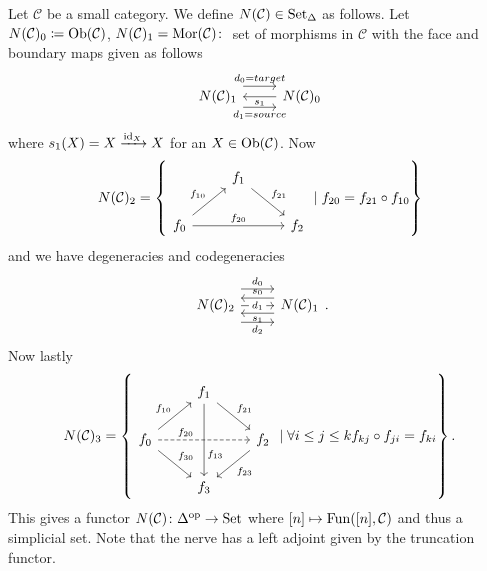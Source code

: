\begin{exmp}
    Let $\mathcal{C}$ be a small category. 
    We define $N(\mathcal{C}) \in \operatorname{Set}_{\Delta}$ as follows. 
    Let $N(\mathcal{C})_0 \coloneqq \operatorname{Ob}(\mathcal{C})$, $N(\mathcal{C})_1=\operatorname{Mor}(\mathcal{C})\colon$ set of morphisms in $\mathcal{C}$ with the face and boundary maps given as follows
    \[
    \begin{tikzcd}
        N ( \mathcal{ C } )_1 
        \ar[r, shift left=1.75ex, "d_0=target"]
        \ar[r, shift right=1.75ex, "d_1=source"']
        &
        N ( \mathcal{ C } )_0
        \ar[l, "s_1"]
    \end{tikzcd}
    \]
    where $ s_1(X) = X \xrightarrow{\operatorname{id}_X} X $ for an $ X \in \operatorname{Ob} ( \mathcal{ C } ) $. Now
    \[
    N ( \mathcal{ C } )_2 =
    \left\{
    \begin{tikzcd}
        &
        f_1
        \ar[rd, "f_{21}"]
        &
        \\
        f_0
        \ar[ru, "f_{10}"]
        \ar[rr, "f_{20}"]
        &&
        f_2
    \end{tikzcd}
    \mid f_{20} = f_{21} \circ f_{10}
    \right\}
    \]
    and we have degeneracies and codegeneracies
    \[
    \begin{tikzcd}
        N ( \mathcal{ C } )_2
        \ar[r, shift left= 2.75ex, "d_0"]
        \ar[r, "d_1" description]
        \ar[r, shift left= -2.75ex, "d_2"']
        &
        N ( \mathcal{ C } )_1
        \ar[l, shift left= - 1.25ex, "s_0"']
        \ar[l, shift left= 1.25ex,"s_1"]
    \end{tikzcd}.
    \]
    Now lastly 
    \[
    N ( \mathcal{ C } )_3 
    =
    \left\{
    \begin{tikzcd}
        & 
        f_1
        \ar[rd, "f_{21}"]
        \ar[dd, "f_{13}" pos=0.7]
        &
        \\
        f_0
        \ar[ru, "f_{10}"]
        \ar[rd, "f_{30}"]
        \ar[rr, dashed, "f_{20}" pos=0.3]
        &&
        f_2
        \ar[dl, "f_{23}"]
        \\
        &
        f_3
        &
    \end{tikzcd}
    \mid \forall i \leq j \leq k 
    f_{kj} \circ f_{ji} = f_{ki}
    \right\}.
    \]
    This gives a functor $ N ( \mathcal{ C } ) \colon \Delta^{\operatorname{op}} \to \operatorname{Set} $ where $ [ n ] \mapsto \operatorname{Fun}( [n] , \mathcal{ C } )$ and thus a simplicial set.
    Note that the nerve has a left adjoint given by the truncation functor.
\end{exmp}

